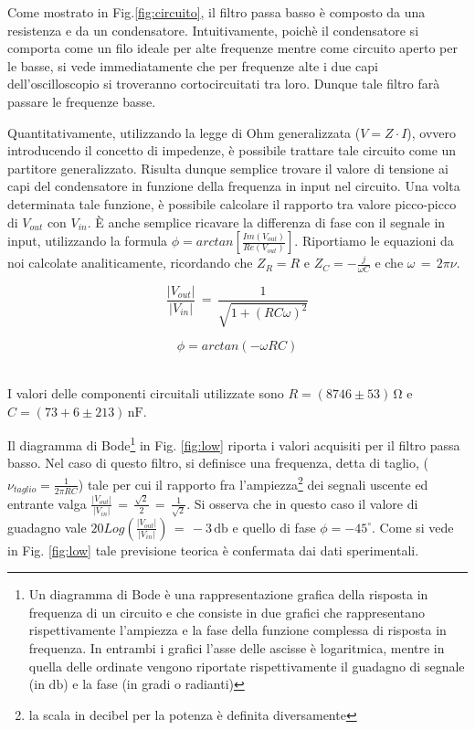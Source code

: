 Come mostrato in Fig.\ref{fig:circuito}, il filtro passa basso è composto da una resistenza e da un condensatore. Intuitivamente, poichè il condensatore si comporta come un filo ideale per alte frequenze mentre come circuito aperto per le basse, si vede immediatamente che per frequenze alte i due capi dell'oscilloscopio si troveranno cortocircuitati tra loro. Dunque tale filtro farà passare le frequenze basse.

Quantitativamente, utilizzando la legge di Ohm generalizzata ($V=Z \cdot I$), ovvero introducendo il concetto di impedenze, è possibile trattare tale circuito come un partitore generalizzato. Risulta dunque semplice trovare il valore di tensione ai capi del condensatore in funzione della frequenza in input nel circuito. Una volta determinata tale funzione, è possibile calcolare il rapporto tra valore picco-picco di $V_{out}$ con $V_{in}$. \`E anche semplice ricavare la differenza di fase con il segnale in input, utilizzando la formula $\phi=arctan[\frac{Im(V_{out})}{Re(V_{out})}]$. Riportiamo le equazioni da noi calcolate analiticamente, ricordando che $Z_R=R$ e $Z_C=-\frac{j}{\omega C}$ e che $\omega\,=\,2\pi\nu$.

\noindent
\begin{minipage}{.5\linewidth}
\begin{equation}
\frac{|V_{out}|}{|V_{in}|}\,=\,\frac{1}{\sqrt{1+(RC\omega)^2}}
\label{eq:lowGain}
\end{equation}
\end{minipage}%
\begin{minipage}{.5\linewidth}
\begin{equation}
\phi=arctan(-\omega R C)
\label{eq:lowPhi}
\end{equation}
\end{minipage}\\

\noindent I valori delle componenti circuitali utilizzate sono $R=(8746 \pm 53)\,\si{\ohm}$ e $C=(73+6 \pm 213)\,\si{\nano\farad}$.

Il diagramma di Bode\footnote{Un diagramma di Bode è una rappresentazione grafica della risposta in frequenza di un circuito e che consiste in due grafici che rappresentano rispettivamente l'ampiezza e la fase della funzione complessa di risposta in frequenza. In entrambi i grafici l'asse delle ascisse è logaritmica, mentre in quella delle ordinate vengono riportate rispettivamente il guadagno di segnale (in $\si{\decibel}$) e la fase (in gradi o radianti)} in Fig. \ref{fig:low} riporta i valori acquisiti per il filtro passa basso. Nel caso di questo filtro, si definisce una frequenza, detta di taglio, ($\nu_{taglio}=\frac{1}{2 \pi RC}$) tale per cui il rapporto fra l'ampiezza\footnote{la scala in decibel per la potenza è definita diversamente} dei segnali uscente ed entrante valga $\frac{|V_{out}|}{|V_{in}|}\,=\,\frac{\sqrt{2}}{2}\,=\,\frac{1}{\sqrt{2}}$. Si osserva che in questo caso il valore di guadagno vale $20Log(\frac{|V_{out}|}{|V_{in}|})\,=\,-3\,\si{\decibel}$ e quello di fase $\phi=-45 ^{\circ}$. Come si vede in Fig. \ref{fig:low} tale previsione teorica è confermata dai dati sperimentali.

